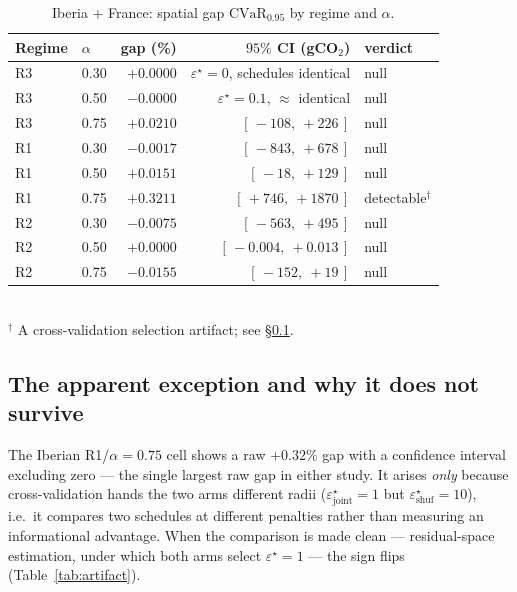 \documentclass[11pt]{article}
\newcommand{\CVaR}{\mathrm{CVaR}}
\begin{document}
\begin{table}[h]\centering
\caption{Iberia + France: spatial gap $\CVaR_{0.95}$ by regime and $\alpha$.}
\label{tab:ib}
\begin{tabular}{@{}llrrl@{}}
\toprule
Regime & $\alpha$ & gap (\%) & $95\%$ CI (gCO$_2$) & verdict \\
\midrule
R3 & 0.30 & $+0.0000$ & $\varepsilon^\star{=}0$, schedules identical & null \\
R3 & 0.50 & $-0.0000$ & $\varepsilon^\star{=}0.1$, $\approx$ identical & null \\
R3 & 0.75 & $+0.0210$ & $[\,-108,\ +226\,]$ & null \\
R1 & 0.30 & $-0.0017$ & $[\,-843,\ +678\,]$ & null \\
R1 & 0.50 & $+0.0151$ & $[\,-18,\ +129\,]$ & null \\
R1 & 0.75 & $+0.3211$ & $[\,+746,\ +1870\,]$ & detectable$^\dagger$ \\
R2 & 0.30 & $-0.0075$ & $[\,-563,\ +495\,]$ & null \\
R2 & 0.50 & $+0.0000$ & $[\,-0.004,\ +0.013\,]$ & null \\
R2 & 0.75 & $-0.0155$ & $[\,-152,\ +19\,]$ & null \\
\bottomrule
\end{tabular}
\\[2pt]{\footnotesize $^\dagger$ A cross-validation selection artifact; see \S\ref{sec:artifact}.}
\end{table}

\subsection{The apparent exception and why it does not survive}\label{sec:artifact}
The Iberian R1/$\alpha{=}0.75$ cell shows a raw $+0.32\%$ gap with a confidence interval excluding zero
--- the single largest raw gap in either study. It arises \emph{only} because cross-validation hands the
two arms different radii ($\varepsilon^\star_{\mathrm{joint}}=1$ but
$\varepsilon^\star_{\mathrm{shuf}}=10$), i.e.\ it compares two schedules at different penalties rather
than measuring an informational advantage. When the comparison is made clean --- residual-space
estimation, under which both arms select $\varepsilon^\star=1$ --- the sign flips
(Table~\ref{tab:artifact}).
\end{document}
